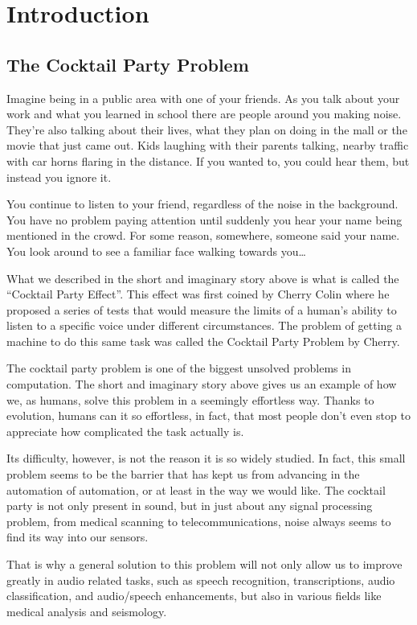\documentclass{book}
\begin{document}
\chapter{Introduction}
\section{The Cocktail Party Problem}
\qquad Imagine being in a public area with one of your friends.
As you talk about your work and what you learned in school there are people around you making noise.
They’re also talking about their lives, what they plan on doing in the mall or the movie that just came out.
Kids laughing with their parents talking, nearby traffic with car horns flaring in the distance.
If you wanted to, you could hear them, but instead you ignore it.
\par
You continue to listen to your friend, regardless of the noise in the background.
You have no problem paying attention until suddenly you hear your name being mentioned in the crowd.
For some reason, somewhere, someone said your name.
You look around to see a familiar face walking towards you…
\par
What we described in the short and imaginary story above is what is called the “Cocktail Party Effect”.
This effect was first coined by Cherry Colin\cite{Cherry} where he proposed a series of tests that would measure the limits of a human’s ability to listen to a specific voice under different circumstances.
The problem of getting a machine to do this same task was called the Cocktail Party Problem by Cherry.
\par
The cocktail party problem is one of the biggest unsolved problems in computation.
The short and imaginary story above gives us an example of how we, as humans, solve this problem in a seemingly effortless way.
Thanks to evolution, humans can it so effortless, in fact, that most people don’t even stop to appreciate how complicated the task actually is.
\par
Its difficulty, however, is not the reason it is so widely studied.
In fact, this small problem seems to be the barrier that has kept us from advancing in the automation of automation, or at least in the way we would like.
The cocktail party is not only present in sound, but in just about any signal processing problem, from medical scanning to telecommunications\cite{CocktailPartyProblemRevisit}, noise always seems to find its way into our sensors.
\par
That is why a general solution to this problem will not only allow us to improve greatly in audio related tasks, such as speech recognition, transcriptions, audio classification, and audio/speech enhancements, but also in various fields like medical analysis and seismology.
\end{document}
